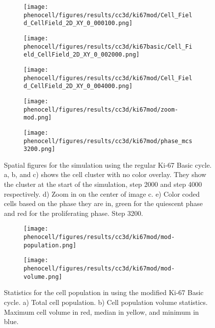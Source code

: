 \begin{figure}[!htbp]
    \centering
    \begin{subfigure}{.32\textwidth}
        \texttt{[image: phenocell/figures/results/cc3d/ki67mod/Cell\_Field\_CellField\_2D\_XY\_0\_000100.png]}
        \caption{}\label{fig:res:cc3d:ki67mod:space:0}
    \end{subfigure}
    \begin{subfigure}{.32\textwidth}
        \texttt{[image: phenocell/figures/results/cc3d/ki67basic/Cell\_Field\_CellField\_2D\_XY\_0\_002000.png]}
        \caption{}\label{fig:res:cc3d:ki67mod:space:2000}
    \end{subfigure}
    \begin{subfigure}{.32\textwidth}
        \texttt{[image: phenocell/figures/results/cc3d/ki67mod/Cell\_Field\_CellField\_2D\_XY\_0\_004000.png]}
        \caption{}\label{fig:res:cc3d:ki67mod:space:4000}
    \end{subfigure}

     \begin{subfigure}{.32\textwidth}
        \texttt{[image: phenocell/figures/results/cc3d/ki67mod/zoom-mod.png]}
        \caption{}\label{fig:res:cc3d:ki67mod:space:4000:zoom}
    \end{subfigure}
    \begin{subfigure}{.32\textwidth}
        \texttt{[image: phenocell/figures/results/cc3d/ki67mod/phase\_mcs3200.png]}
        \caption{}\label{fig:res:cc3d:ki67mod:space:phase}
    \end{subfigure}
    \caption{Spatial figures for the \ccds simulation using the regular Ki-67 Basic cycle. a, b, and c) shows the cell cluster with no color overlay. They show the cluster at the start of the simulation, step 2000 and step 4000 respectively. d) Zoom in on the center of image c. e) Color coded cells based on the phase they are in, green for the quiescent phase and red for the proliferating phase. Step 3200.}
    \label{fig:res:cc3d:ki67mod:space}
\end{figure}


\begin{figure}[!htbp]
    \centering
    \begin{subfigure}{.9\linewidth}
        \texttt{[image: phenocell/figures/results/cc3d/ki67mod/mod-population.png]}
        \caption{}\label{fig:res:cc3d:ki67mod:graphs:pop}
    \end{subfigure}
    \begin{subfigure}{.9\linewidth}
        \texttt{[image: phenocell/figures/results/cc3d/ki67mod/mod-volume.png]}
        \caption{}\label{fig:res:cc3d:ki67mod:graphs:vol}
    \end{subfigure}
    \caption{Statistics for the cell population in \ccds using the modified Ki-67 Basic cycle. a) Total cell population. b) Cell population volume statistics. Maximum cell volume in red, median in yellow, and minimum in blue.}
    \label{fig:res:cc3d:ki67mod:graphs}
\end{figure}


